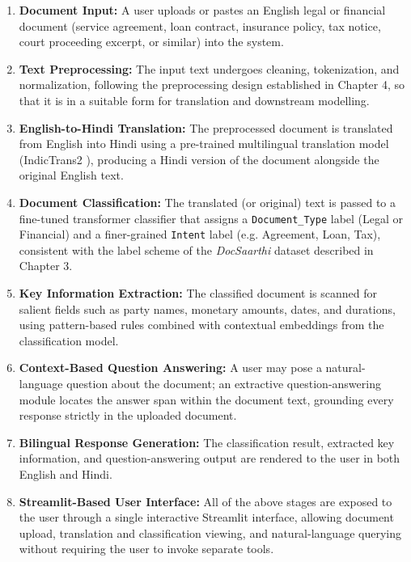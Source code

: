\begin{enumerate}
    \item \textbf{Document Input:} A user uploads or pastes an English legal or financial document (service agreement, loan contract, insurance policy, tax notice, court proceeding excerpt, or similar) into the system.
    \item \textbf{Text Preprocessing:} The input text undergoes cleaning, tokenization, and normalization, following the preprocessing design established in Chapter 4, so that it is in a suitable form for translation and downstream modelling.
    \item \textbf{English-to-Hindi Translation:} The preprocessed document is translated from English into Hindi using a pre-trained multilingual translation model (IndicTrans2 \cite{gala2023indictrans2}), producing a Hindi version of the document alongside the original English text.
    \item \textbf{Document Classification:} The translated (or original) text is passed to a fine-tuned transformer classifier that assigns a \texttt{Document\_Type} label (Legal or Financial) and a finer-grained \texttt{Intent} label (e.g. Agreement, Loan, Tax), consistent with the label scheme of the \textit{DocSaarthi} dataset described in Chapter 3.
    \item \textbf{Key Information Extraction:} The classified document is scanned for salient fields such as party names, monetary amounts, dates, and durations, using pattern-based rules combined with contextual embeddings from the classification model.
    \item \textbf{Context-Based Question Answering:} A user may pose a natural-language question about the document; an extractive question-answering module locates the answer span within the document text, grounding every response strictly in the uploaded document.
    \item \textbf{Bilingual Response Generation:} The classification result, extracted key information, and question-answering output are rendered to the user in both English and Hindi.
    \item \textbf{Streamlit-Based User Interface:} All of the above stages are exposed to the user through a single interactive Streamlit interface, allowing document upload, translation and classification viewing, and natural-language querying without requiring the user to invoke separate tools.
\end{enumerate}


